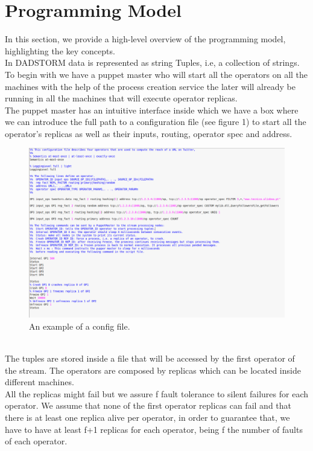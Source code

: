 \documentclass[times, 10pt, twocolumn]{article}
\begin{document}
\section{Programming Model}
In this section, we provide a high-level overview of the programming model, highlighting the key concepts. 
\\In DADSTORM data is represented as string Tuples, i.e, a collection of strings.
\\To begin with we have a puppet master who will start all the operators on all the machines with the help of the process creation service the later will already be running in all the machines that will execute operator replicas.
\\The puppet master has an intuitive interface inside which we have a box where we can introduce the full path to a configuration file (see figure 1) to start all the operator's replicas as well as their inputs, routing, operator spec and address.
\begin{figure}
  \includegraphics[width=\linewidth]{configFileExample.PNG}
  \caption{An example of a config file.}
\end{figure}
\\The tuples are stored inside a file that will be accessed by the first operator of the stream. The operators are composed by replicas which can be located inside different machines.
\\All the replicas might fail but we assure f fault tolerance to silent failures for each operator. We assume that none of the first operator replicas can fail and that there is at least one replica alive per operator, in order to guarantee that, we have to have at least f+1 replicas for each operator, being f the number of faults of each operator.
\end{document}
